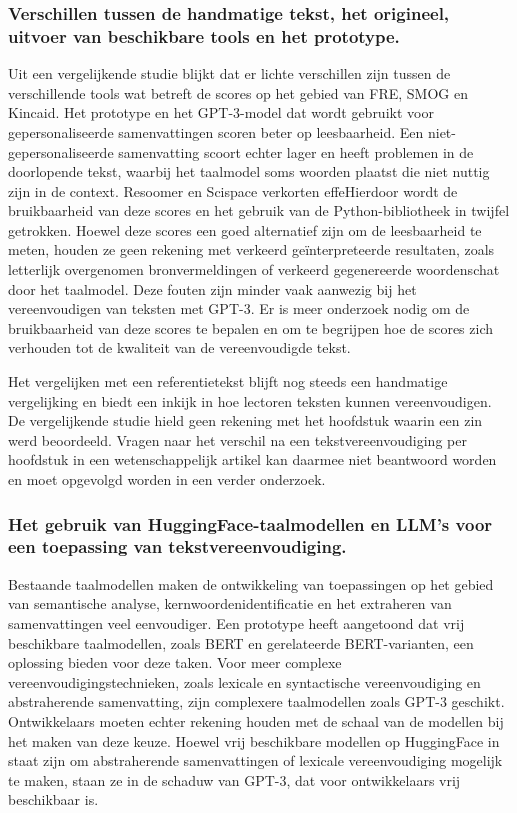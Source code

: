 \subsubsection{Verschillen tussen de handmatige tekst, het origineel, uitvoer van beschikbare tools en het prototype.}

Uit een vergelijkende studie blijkt dat er lichte verschillen zijn tussen de verschillende tools wat betreft de scores op het gebied van FRE, SMOG en Kincaid. Het prototype en het GPT-3-model dat wordt gebruikt voor gepersonaliseerde samenvattingen scoren beter op leesbaarheid. Een niet-gepersonaliseerde samenvatting scoort echter lager en heeft problemen in de doorlopende tekst, waarbij het taalmodel soms woorden plaatst die niet nuttig zijn in de context. Resoomer en Scispace verkorten effeHierdoor wordt de bruikbaarheid van deze scores en het gebruik van de Python-bibliotheek in twijfel getrokken. Hoewel deze scores een goed alternatief zijn om de leesbaarheid te meten, houden ze geen rekening met verkeerd geïnterpreteerde resultaten, zoals letterlijk overgenomen bronvermeldingen of verkeerd gegenereerde woordenschat door het taalmodel. Deze fouten zijn minder vaak aanwezig bij het vereenvoudigen van teksten met GPT-3. Er is meer onderzoek nodig om de bruikbaarheid van deze scores te bepalen en om te begrijpen hoe de scores zich verhouden tot de kwaliteit van de vereenvoudigde tekst. 

\medskip

Het vergelijken met een referentietekst blijft nog steeds een handmatige vergelijking en biedt een inkijk in hoe lectoren teksten kunnen vereenvoudigen. De vergelijkende studie hield geen rekening met het hoofdstuk waarin een zin werd beoordeeld. Vragen naar het verschil na een tekstvereenvoudiging per hoofdstuk in een wetenschappelijk artikel kan daarmee niet beantwoord worden en moet opgevolgd worden in een verder onderzoek.

\subsubsection{Het gebruik van HuggingFace-taalmodellen en LLM's voor een toepassing van tekstvereenvoudiging.}

Bestaande taalmodellen maken de ontwikkeling van toepassingen op het gebied van semantische analyse, kernwoordenidentificatie en het extraheren van samenvattingen veel eenvoudiger. Een prototype heeft aangetoond dat vrij beschikbare taalmodellen, zoals BERT en gerelateerde BERT-varianten, een oplossing bieden voor deze taken. Voor meer complexe vereenvoudigingstechnieken, zoals lexicale en syntactische vereenvoudiging en abstraherende samenvatting, zijn complexere taalmodellen zoals GPT-3 geschikt. Ontwikkelaars moeten echter rekening houden met de schaal van de modellen bij het maken van deze keuze. Hoewel vrij beschikbare modellen op HuggingFace in staat zijn om abstraherende samenvattingen of lexicale vereenvoudiging mogelijk te maken, staan ze in de schaduw van GPT-3, dat voor ontwikkelaars vrij beschikbaar is. 

